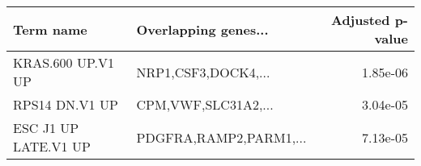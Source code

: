 \begin{tabular}{llr}
\toprule
           Term name &   Overlapping genes... &  Adjusted p-value \\
\midrule
   KRAS.600 UP.V1 UP &    NRP1,CSF3,DOCK4,... &          1.85e-06 \\
      RPS14 DN.V1 UP &    CPM,VWF,SLC31A2,... &          3.04e-05 \\
ESC J1 UP LATE.V1 UP & PDGFRA,RAMP2,PARM1,... &          7.13e-05 \\
\bottomrule
\end{tabular}
